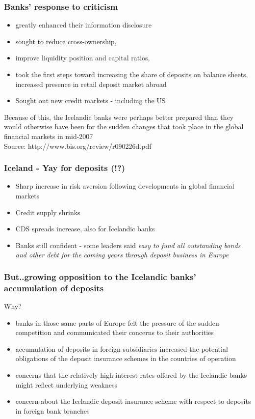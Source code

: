 \documentclass[11pt]{beamer}
\begin{document}
\begin{frame}
\frametitle{Banks' response to criticism}
\begin{itemize}
\item greatly enhanced their information disclosure
\item sought to reduce cross-ownership,
\item improve liquidity position and capital ratios,
\item took the first steps toward increasing the share of deposits on balance sheets, increased presence in retail deposit market abroad
\item Sought out new credit markets - including the US
\end{itemize}
Because of this, the Icelandic banks were perhaps better prepared than they would otherwise have been for the sudden changes that took place in the global financial markets in mid-2007
\\
\tiny{Source: http://www.bis.org/review/r090226d.pdf}
\end{frame}

\begin{frame}
\frametitle{Iceland - Yay for deposits (!?)}
\begin{itemize}
\item Sharp increase in risk aversion following developments in global financial markets
\item Credit supply shrinks
\item CDS spreads increase, also for Icelandic banks
\item Banks still confident - some leaders said \textit{easy to fund all  outstanding bonds and other debt for the coming years through deposit business in Europe}
\end{itemize}
\end{frame}

\begin{frame}
\frametitle{But..growing opposition to the Icelandic banks’
accumulation of deposits}
Why?
\begin{itemize}
\item banks in those same parts of Europe felt the pressure of the sudden competition and communicated their concerns to their authorities
\item accumulation of deposits in foreign subsidiaries increased the potential obligations of the deposit insurance schemes in the countries of operation
\item concerns that the relatively high interest rates offered by the Icelandic banks might reflect underlying weakness
\item concern about the Icelandic deposit insurance scheme with respect to deposits in foreign bank branches
\end{itemize}
\end{frame}
\end{document}
